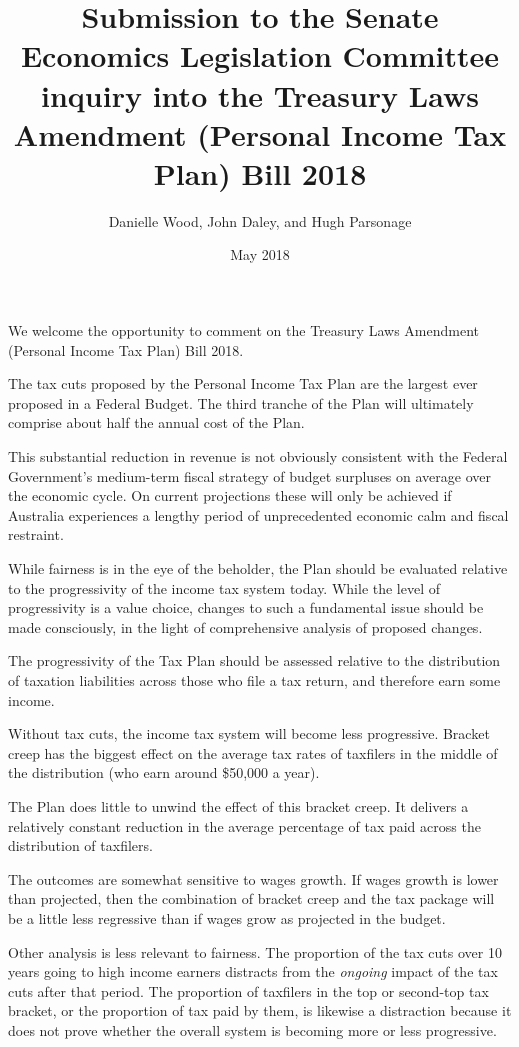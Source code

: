 \documentclass[submission]{grattan}\usepackage[]{graphicx}\usepackage[]{color}
\date{May 2018}
\title{Submission to the Senate Economics Legislation Committee inquiry into the Treasury Laws Amendment (Personal Income Tax Plan) Bill 2018}
\author{Danielle Wood, John Daley, and Hugh Parsonage}
\begin{document}
\begin{summary}

We welcome the opportunity to comment on the Treasury Laws Amendment (Personal Income Tax Plan) Bill 2018.

The tax cuts proposed by the Personal Income Tax Plan are the largest ever proposed in a Federal Budget. The third tranche of the Plan will ultimately comprise about half the annual cost of the Plan.

This substantial reduction in revenue is not obviously consistent with the Federal Government's medium-term fiscal strategy of budget surpluses on average over the economic cycle. On current projections these will only be achieved if Australia experiences a lengthy period of unprecedented economic calm and fiscal restraint.

While fairness is in the eye of the beholder, the Plan should be evaluated relative to the progressivity of the income tax system today. While the level of progressivity is a value choice, changes to such a fundamental issue should be made consciously, in the light of comprehensive analysis of proposed changes.

The progressivity of the Tax Plan should be assessed relative to the distribution of taxation liabilities across those who file a tax return, and therefore earn some income.

Without tax cuts, the income tax system will become less progressive. Bracket creep has the biggest effect on the average tax rates of taxfilers in the middle of the distribution (who earn around \$50,000 a year).

The Plan does little to unwind the effect of this bracket creep. It delivers a relatively constant reduction in the average percentage of tax paid across the distribution of taxfilers.

The outcomes are somewhat sensitive to wages growth. If wages growth is lower than projected, then the combination of bracket creep and the tax package will be a little less regressive than if wages grow as projected in the budget.

Other analysis is less relevant to fairness. The proportion of the tax cuts over 10 years going to high income earners distracts from the \emph{ongoing} impact of the tax cuts after that period. The proportion of taxfilers in the top or second-top tax bracket, or the proportion of tax paid by them, is likewise a distraction because it does not prove whether the overall system is becoming more or less progressive.
\end{summary}
\end{document}

